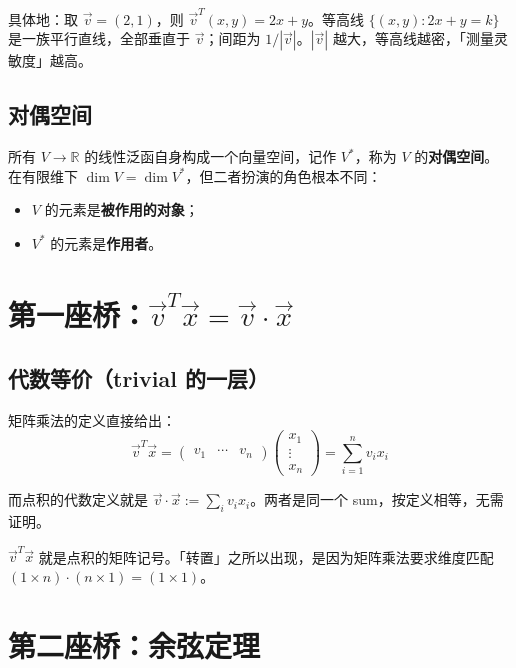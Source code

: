 \documentclass[11pt,a4paper]{article}
\begin{document}
具体地：取 $\vec{v} = (2, 1)$，则 $\vec{v}^T(x, y) = 2x + y$。等高线 $\{(x,y) : 2x+y = k\}$ 是一族平行直线，全部垂直于 $\vec{v}$；间距为 $1/|\vec{v}|$。$|\vec{v}|$ 越大，等高线越密，「测量灵敏度」越高。

\subsection{对偶空间}

所有 $V \to \mathbb{R}$ 的线性泛函自身构成一个向量空间，记作 $V^*$，称为 $V$ 的\textbf{对偶空间}。在有限维下 $\dim V = \dim V^*$，但二者扮演的角色根本不同：
\begin{itemize}
    \item $V$ 的元素是\textbf{被作用的对象}；
    \item $V^*$ 的元素是\textbf{作用者}。
\end{itemize}

\section{第一座桥：$\vec{v}^T \vec{x} = \vec{v} \cdot \vec{x}$}

\subsection{代数等价（trivial 的一层）}

矩阵乘法的定义直接给出：
$$\vec{v}^T \vec{x} = \begin{pmatrix} v_1 & \cdots & v_n \end{pmatrix} \begin{pmatrix} x_1 \\ \vdots \\ x_n \end{pmatrix} = \sum_{i=1}^n v_i x_i$$

而点积的代数定义就是 $\vec{v} \cdot \vec{x} := \sum_i v_i x_i$。两者是同一个 sum，按定义相等，无需证明。

\begin{summary}
    $\vec{v}^T \vec{x}$ 就是点积的矩阵记号。「转置」之所以出现，是因为矩阵乘法要求维度匹配 $(1\times n) \cdot (n \times 1) = (1 \times 1)$。
\end{summary}

\section{第二座桥：余弦定理}
\end{document}
